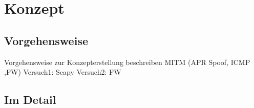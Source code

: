 \chapter{Konzept}
\section{Vorgehensweise}
    Vorgehensweise zur Konzepterstellung beschreiben
    MITM (APR Spoof, ICMP ,FW)
    Versuch1: Scapy
    Versuch2: FW

\section{Im Detail}